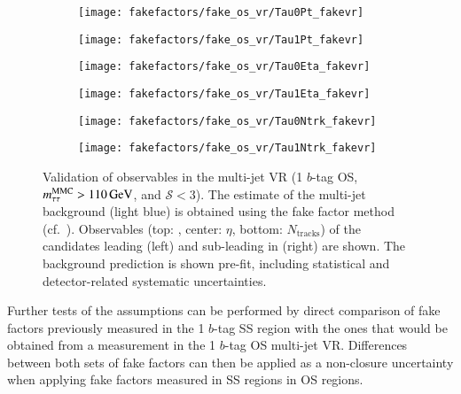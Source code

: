 \begin{figure}[p]
  \centering

  \begin{subfigure}{0.45\textwidth}
    \texttt{[image: fakefactors/fake\_os\_vr/Tau0Pt\_fakevr]}
  \end{subfigure}\hspace*{0.04\textwidth}%
  \begin{subfigure}{0.45\textwidth}
    \texttt{[image: fakefactors/fake\_os\_vr/Tau1Pt\_fakevr]}
  \end{subfigure}

  \begin{subfigure}{0.45\textwidth}
    \texttt{[image: fakefactors/fake\_os\_vr/Tau0Eta\_fakevr]}
  \end{subfigure}\hspace*{0.04\textwidth}%
  \begin{subfigure}{0.45\textwidth}
    \texttt{[image: fakefactors/fake\_os\_vr/Tau1Eta\_fakevr]}
  \end{subfigure}

  \begin{subfigure}{0.45\textwidth}
    \texttt{[image: fakefactors/fake\_os\_vr/Tau0Ntrk\_fakevr]}
  \end{subfigure}\hspace*{0.04\textwidth}%
  \begin{subfigure}{0.45\textwidth}
    \texttt{[image: fakefactors/fake\_os\_vr/Tau1Ntrk\_fakevr]}
  \end{subfigure}

  \caption{Validation of \tauhadvis observables in the multi-jet VR (1
    $b$-tag OS, $m_{\tau\tau}^\text{MMC} > \SI{110}{\ensuremath{\text{GeV}}}$, and $\mathcal{S} < 3$). The
    estimate of the multi-jet background (light blue) is obtained
    using the fake factor method (cf.\
    ). Observables (top: \tauhadvis \pT,
    center: \tauhadvis $\eta$, bottom: \tauhadvis $N_\text{tracks}$)
    of the \tauhadvis candidates leading (left) and sub-leading in \pT
    (right) are shown. The background prediction is shown pre-fit,
    including statistical and detector-related systematic
    uncertainties.}%
  \label{fig:fake_factor_OSVR_kinematics}%
\end{figure}

Further tests of the assumptions can be performed by direct comparison
of fake factors previously measured in the 1 $b$-tag SS region with
the ones that would be obtained from a measurement in the 1 $b$-tag OS
multi-jet VR. Differences between both sets of fake factors can then
be applied as a non-closure uncertainty when applying fake factors
measured in SS regions in OS regions.

